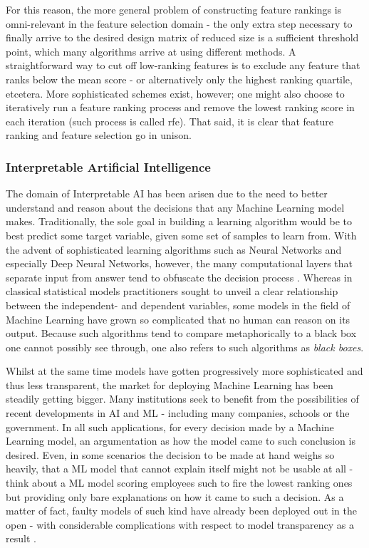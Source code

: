 \documentclass{article}
\begin{document}
For this reason, the more general problem of constructing feature rankings is omni-relevant in the feature selection domain - the only extra step necessary to finally arrive to the desired design matrix of reduced size is a sufficient threshold point, which many algorithms arrive at using different methods. A straightforward way to cut off low-ranking features is to exclude any feature that ranks below the mean score - or alternatively only the highest ranking quartile, etcetera. More sophisticated schemes exist, however; one might also choose to iteratively run a feature ranking process and remove the lowest ranking score in each iteration (such process is called \gls{rfe}). That said, it is clear that feature ranking and feature selection go in unison.

\subsubsection{Interpretable Artificial Intelligence}
The domain of Interpretable AI has been arisen due to the need to better understand and reason about the decisions that any Machine Learning model makes. Traditionally, the sole goal in building a learning algorithm would be to best predict some target variable, given some set of samples to learn from. With the advent of sophisticated learning algorithms such as Neural Networks and especially Deep Neural Networks, however, the many computational layers that separate input from answer tend to obfuscate the decision process \citep{rai_explainable_2020}. Whereas in classical statistical models practitioners sought to unveil a clear relationship between the independent- and dependent variables, some models in the field of Machine Learning have grown so complicated that no human can reason on its output. Because such algorithms tend to compare metaphorically to a black box one cannot possibly see through, one also refers to such algorithms as \textit{black boxes}.

Whilst at the same time models have gotten progressively more sophisticated and thus less transparent, the market for deploying Machine Learning has been steadily getting bigger. Many institutions seek to benefit from the possibilities of recent developments in AI and ML - including many companies, schools or the government. In all such applications, for every decision made by a Machine Learning model, an argumentation as how the model came to such conclusion is desired. Even, in some scenarios the decision to be made at hand weighs so heavily, that a ML model that cannot explain itself might not be usable at all - think about a ML model scoring employees such to fire the lowest ranking ones but providing only bare explanations on how it came to such a decision. As a matter of fact, faulty models of such kind have already been deployed out in the open - with considerable complications with respect to model transparency as a result \citep{oneil_weapons_2016}.
\end{document}
